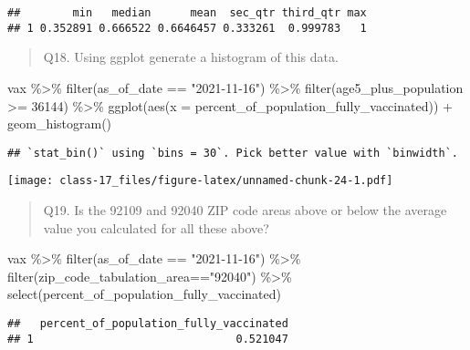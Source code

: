 \documentclass[
]{article}
\newenvironment{Shaded}{\begin{snugshade}}{\end{snugshade}}
\newcommand{\AttributeTok}[1]{\textcolor[rgb]{0.77,0.63,0.00}{#1}}
\newcommand{\DecValTok}[1]{\textcolor[rgb]{0.00,0.00,0.81}{#1}}
\newcommand{\FunctionTok}[1]{\textcolor[rgb]{0.00,0.00,0.00}{#1}}
\newcommand{\NormalTok}[1]{#1}
\newcommand{\SpecialCharTok}[1]{\textcolor[rgb]{0.00,0.00,0.00}{#1}}
\newcommand{\StringTok}[1]{\textcolor[rgb]{0.31,0.60,0.02}{#1}}
\begin{document}
\begin{verbatim}
##        min   median      mean  sec_qtr third_qtr max
## 1 0.352891 0.666522 0.6646457 0.333261  0.999783   1
\end{verbatim}

\begin{quote}
Q18. Using ggplot generate a histogram of this data.
\end{quote}

\begin{Shaded}
\begin{Highlighting}[]
\NormalTok{vax }\SpecialCharTok{\%\textgreater{}\%} 
  \FunctionTok{filter}\NormalTok{(as\_of\_date }\SpecialCharTok{==} \StringTok{"2021{-}11{-}16"}\NormalTok{) }\SpecialCharTok{\%\textgreater{}\%} 
  \FunctionTok{filter}\NormalTok{(age5\_plus\_population }\SpecialCharTok{\textgreater{}=} \DecValTok{36144}\NormalTok{) }\SpecialCharTok{\%\textgreater{}\%} 
  \FunctionTok{ggplot}\NormalTok{(}\FunctionTok{aes}\NormalTok{(}\AttributeTok{x =}\NormalTok{ percent\_of\_population\_fully\_vaccinated)) }\SpecialCharTok{+}
  \FunctionTok{geom\_histogram}\NormalTok{()}
\end{Highlighting}
\end{Shaded}

\begin{verbatim}
## `stat_bin()` using `bins = 30`. Pick better value with `binwidth`.
\end{verbatim}

\texttt{[image: class-17\_files/figure-latex/unnamed-chunk-24-1.pdf]}

\begin{quote}
Q19. Is the 92109 and 92040 ZIP code areas above or below the average
value you calculated for all these above?
\end{quote}

\begin{Shaded}
\begin{Highlighting}[]
\NormalTok{vax }\SpecialCharTok{\%\textgreater{}\%} \FunctionTok{filter}\NormalTok{(as\_of\_date }\SpecialCharTok{==} \StringTok{"2021{-}11{-}16"}\NormalTok{) }\SpecialCharTok{\%\textgreater{}\%}  
  \FunctionTok{filter}\NormalTok{(zip\_code\_tabulation\_area}\SpecialCharTok{==}\StringTok{"92040"}\NormalTok{) }\SpecialCharTok{\%\textgreater{}\%}
  \FunctionTok{select}\NormalTok{(percent\_of\_population\_fully\_vaccinated)}
\end{Highlighting}
\end{Shaded}

\begin{verbatim}
##   percent_of_population_fully_vaccinated
## 1                               0.521047
\end{verbatim}
\end{document}
